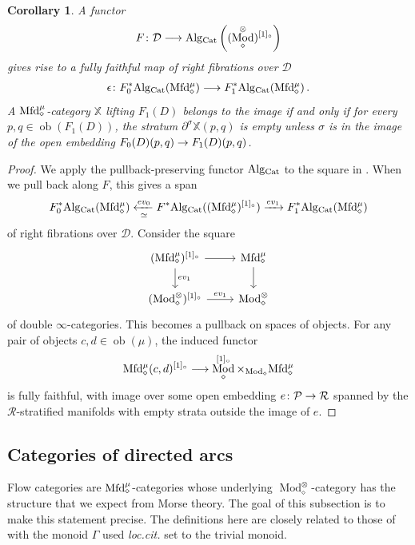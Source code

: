 \documentclass[10pt]{amsart}
\numberwithin{equation}{section}
\newtheorem{cor}[prop]{Corollary}
\theoremstyle{definition}
\DeclareMathOperator{\Mod}{Mod}
\DeclareMathOperator{\ob}{ob}
\newcommand{\Cat}{\mathrm{Cat}\vphantom{t}}
\newcommand{\Mfd}{\mathrm{Mfd}\vphantom{d}}
\newcommand{\Alg}{\mathrm{Alg}\vphantom{z}}
\newcommand{\bX}{\mathbb{X}}
\newcommand{\calD}{\mathcal{D}}
\newcommand{\cP}{\mathcal{P}}
\newcommand{\cR}{\mathcal{R}}
\newcommand{\del}{\partial}
\renewcommand{\to}{\mathchoice{\longrightarrow}{\rightarrow}{}{}}
\begin{document}
\begin{cor}\label{cor:relabeling}
	A functor
	\begin{align*}
		F \colon \calD \to \Alg_{\Cat}\left( (\Mod_{\diamond}^{\otimes})^{[1]_{\circ}} \right)
	\end{align*}
	gives rise to a fully faithful map of right fibrations over $\calD$
	\begin{align*}
		\epsilon \colon F^{*}_{0}\Alg_{\Cat}(\Mfd^{\mu}_{\diamond}) \to F^{*}_{1}\Alg_{\Cat}(\Mfd^{\mu}_{\diamond}) \,.
	\end{align*}
	A $\Mfd^{\mu}_{\diamond}$-category $\bX$ lifting $F_{1}(D)$ belongs to the image if and only if for every $p,q \in \ob(F_{1}(D))$, the stratum $\del^{\sigma}\bX(p,q)$ is empty unless $\sigma$ is in the image of the open embedding $F_{0}(D)(p,q)\to F_{1}(D)(p,q)$.
\end{cor}
\begin{proof}
	We apply the pullback-preserving functor $\Alg_{\Cat}$ to the square in .
  When we pull back along $F$, this gives a span
	\begin{align*}
		F_{0}^{*}\Alg_{\Cat}(\Mfd^{\mu}_{\diamond}) \xleftarrow[\simeq]{ev_{0}} F^{*}\Alg_{\Cat}( (\Mfd^{\mu}_{\diamond})^{[1]_{\circ}}  ) \xrightarrow{ev_{1}} F_{1}^{*}\Alg_{\Cat}(\Mfd^{\mu}_{\diamond})
	\end{align*}
	of right fibrations over $\calD$.
  Consider the square
	\begin{equation*}
		\begin{tikzcd}
			(\Mfd^{\mu}_{\diamond})^{[1]_{\circ}} \arrow[r] \arrow[d,"ev_{1}"]      &   \Mfd_{\diamond}^{\mu}  \arrow[d] \\
			(\Mod_{\diamond}^{\otimes})^{[1]_{\circ}}  \arrow[r, "ev_{1}"]               &  \Mod_{\diamond}^{\otimes}
		\end{tikzcd}
	\end{equation*}
  of double $\infty$-categories.
	This becomes a pullback on spaces of objects.
  For any pair of objects $c,d\in \ob(\mu)$, the induced functor
	\begin{align*}
		\Mfd^{\mu}_{\diamond}(c,d)^{[1]_{\circ}} \to \Mod_{\diamond}^{[1]_{\circ}}\times_{ \Mod_{\diamond}} \Mfd_{\diamond}^{\mu}
	\end{align*}
	is fully faithful, with image over some open embedding $e\colon \cP \to \cR$ spanned by the $\cR$-stratified manifolds with empty strata outside the image of $e$.
\end{proof}


\subsection{Categories of directed arcs}\label{subsec:categories_of_directed_arcs}
Flow categories are $\Mfd_{\diamond}^{\mu}$-categories whose underlying $\Mod_{\diamond}^{\otimes}$-category has the structure that we expect from Morse theory.
The goal of this subsection is to make this statement precise.
The definitions here are closely related to those of \cite[Section 3.1]{AB} with the monoid $\Gamma$ used \emph{loc.cit.} set to the trivial monoid.
\end{document}
